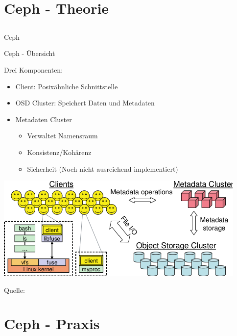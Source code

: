 \documentclass[notes=hide,yellow]{beamer}
\begin{document}
\section{Ceph - Theorie}
\subsection*{}

\begin{frame}
	\begin{center}
	\Large{Ceph}
	\end{center}
\end{frame}

\begin{frame}{Ceph - \"Ubersicht}
	
	Drei Komponenten:
	\begin{itemize}
		\item Client: Posix\"ahnliche Schnittstelle %
		\item OSD Cluster: Speichert Daten und Metadaten
		\item Metadaten Cluster
			\begin{itemize}
				\item Verwaltet Namensraum
				\item Konsistenz/Koh\"arenz
				\item Sicherheit (Noch nicht ausreichend implementiert)
			\end{itemize}
	\end{itemize}
\end{frame}

\begin{frame}
	\begin{center}
		\includegraphics{ceph_architecture.pdf}
	\end{center}
	Quelle: \cite{weil2006}
\end{frame}


\section{Ceph - Praxis}
\end{document}
